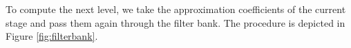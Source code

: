 To compute the next level, we take the approximation coefficients of the current stage and pass them again through the filter bank.
The procedure is depicted in Figure \ref{fig:filterbank}.







